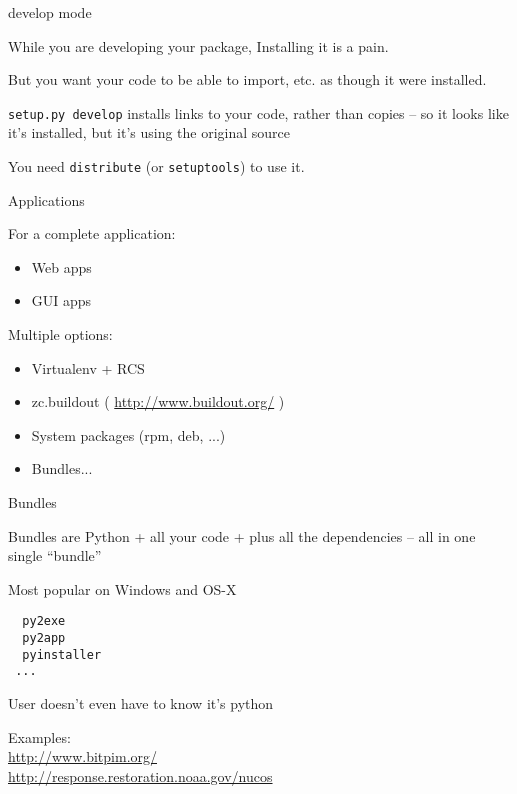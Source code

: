 \documentclass{beamer}
\begin{document}
\begin{frame}[fragile]{develop mode}

{\Large While you are developing your package, Installing it is a pain.}

\vfill
{\Large But you want your code to be able to import, etc. as though it were installed.}

\vfill
{\Large \verb|setup.py develop|
\vfill
installs links to your code, rather than copies
   -- so it looks like it's installed, but it's using the original source}

\vfill
{\Large You need \verb|distribute| (or \verb|setuptools|) to use it.}
\vfill
\end{frame} 

\begin{frame}[fragile]{Applications}

{\Large For a complete application:}
\begin{itemize}
  \item Web apps
  \item GUI apps
\end{itemize}

{\Large Multiple options:}
\begin{itemize}
  \item Virtualenv + RCS
  \item zc.buildout ( \url{http://www.buildout.org/} )
  \item System packages (rpm, deb, ...)
  \item Bundles...
\end{itemize}

\end{frame} 

\begin{frame}[fragile]{Bundles}

{\Large
Bundles are Python + all your code + plus all the dependencies --
all in one single ``bundle'' 

\vfill
Most popular on Windows and OS-X
}
\begin{verbatim}
  py2exe
  py2app
  pyinstaller
 ...
\end{verbatim}

{\Large User doesn't even have to know it's python }

\vfill
Examples: \\
\hspace{0.5in} \url{http://www.bitpim.org/} \\
\hspace{0.5in} \url{http://response.restoration.noaa.gov/nucos}

\end{frame} 
\end{document}
